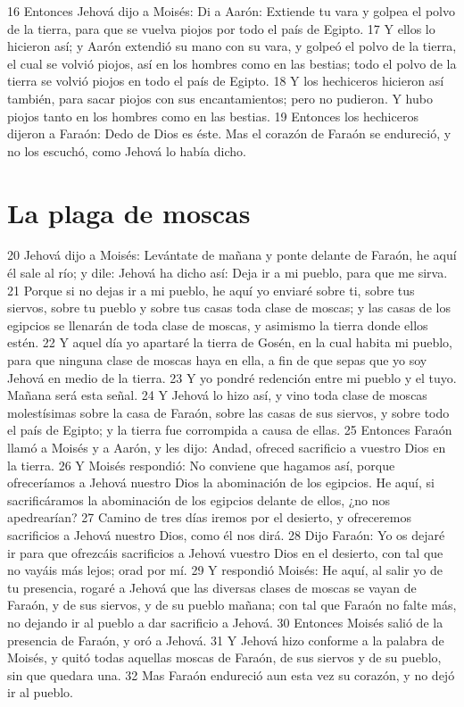 16 Entonces Jehová dijo a Moisés: Di a Aarón: Extiende tu vara y golpea el polvo de la tierra, para que se vuelva piojos por todo el país de Egipto.
17 Y ellos lo hicieron así; y Aarón extendió su mano con su vara, y golpeó el polvo de la tierra, el cual se volvió piojos, así en los hombres como en las bestias; todo el polvo de la tierra se volvió piojos en todo el país de Egipto.
18 Y los hechiceros hicieron así también, para sacar piojos con sus encantamientos; pero no pudieron. Y hubo piojos tanto en los hombres como en las bestias.
19 Entonces los hechiceros dijeron a Faraón: Dedo de Dios es éste. Mas el corazón de Faraón se endureció, y no los escuchó, como Jehová lo había dicho.

\section*{La plaga de moscas}

20 Jehová dijo a Moisés: Levántate de mañana y ponte delante de Faraón, he aquí él sale al río; y dile: Jehová ha dicho así: Deja ir a mi pueblo, para que me sirva.
21 Porque si no dejas ir a mi pueblo, he aquí yo enviaré sobre ti, sobre tus siervos, sobre tu pueblo y sobre tus casas toda clase de moscas; y las casas de los egipcios se llenarán de toda clase de moscas, y asimismo la tierra donde ellos estén.
22 Y aquel día yo apartaré la tierra de Gosén, en la cual habita mi pueblo, para que ninguna clase de moscas haya en ella, a fin de que sepas que yo soy Jehová en medio de la tierra.
23 Y yo pondré redención entre mi pueblo y el tuyo. Mañana será esta señal.
24 Y Jehová lo hizo así, y vino toda clase de moscas molestísimas sobre la casa de Faraón, sobre las casas de sus siervos, y sobre todo el país de Egipto; y la tierra fue corrompida a causa de ellas.
25 Entonces Faraón llamó a Moisés y a Aarón, y les dijo: Andad, ofreced sacrificio a vuestro Dios en la tierra.
26 Y Moisés respondió: No conviene que hagamos así, porque ofreceríamos a Jehová nuestro Dios la abominación de los egipcios. He aquí, si sacrificáramos la abominación de los egipcios delante de ellos, ¿no nos apedrearían?
27 Camino de tres días iremos por el desierto, y ofreceremos sacrificios a Jehová nuestro Dios, como él nos dirá.
28 Dijo Faraón: Yo os dejaré ir para que ofrezcáis sacrificios a Jehová vuestro Dios en el desierto, con tal que no vayáis más lejos; orad por mí.
29 Y respondió Moisés: He aquí, al salir yo de tu presencia, rogaré a Jehová que las diversas clases de moscas se vayan de Faraón, y de sus siervos, y de su pueblo mañana; con tal que Faraón no falte más, no dejando ir al pueblo a dar sacrificio a Jehová.
30 Entonces Moisés salió de la presencia de Faraón, y oró a Jehová.
31 Y Jehová hizo conforme a la palabra de Moisés, y quitó todas aquellas moscas de Faraón, de sus siervos y de su pueblo, sin que quedara una.
32 Mas Faraón endureció aun esta vez su corazón, y no dejó ir al pueblo.


